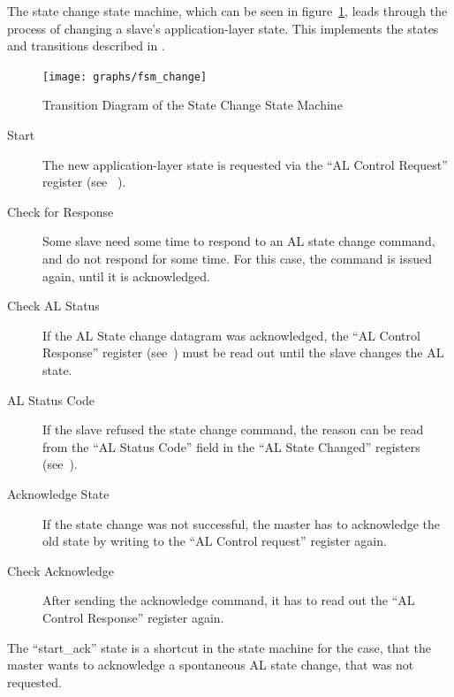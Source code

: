 \documentclass[a4paper,12pt,BCOR6mm,bibtotoc,idxtotoc]{scrbook}
\begin{document}
The state change state machine, which can be seen in
figure~\ref{fig:fsm-change}, leads through the process of changing a slave's
application-layer state. This implements the states and transitions described
in \cite[sec.~6.4.1]{alspec}.

\begin{figure}[htbp]
  \centering
  \texttt{[image: graphs/fsm\_change]}
  \caption{Transition Diagram of the State Change State Machine}
  \label{fig:fsm-change}
\end{figure}

\begin{description}

\item[Start] The new application-layer state is requested via the ``AL Control
Request'' register (see ~\cite[sec. 5.3.1]{alspec}).

\item[Check for Response] Some slave need some time to respond to an AL state
change command, and do not respond for some time. For this case, the command
is issued again, until it is acknowledged.

\item[Check AL Status] If the AL State change datagram was acknowledged, the
``AL Control Response'' register (see~\cite[sec. 5.3.2]{alspec}) must be read
out until the slave changes the AL state.

\item[AL Status Code] If the slave refused the state change command, the
reason can be read from the ``AL Status Code'' field in the ``AL State
Changed'' registers (see~\cite[sec. 5.3.3]{alspec}).

\item[Acknowledge State] If the state change was not successful, the master
has to acknowledge the old state by writing to the ``AL Control request''
register again.

\item[Check Acknowledge] After sending the acknowledge command, it has to read
out the ``AL Control Response'' register again.

\end{description}

The ``start\_ack'' state is a shortcut in the state machine for the case, that
the master wants to acknowledge a spontaneous AL state change, that was not
requested.

\end{document}

